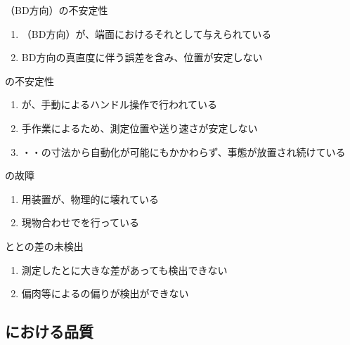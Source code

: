 \begin{Issues}{\KeywayCenterMeasurement（BD方向）の不安定性}
\begin{enumerate}[label=\sarrow]
\item[{\sarrow[red]}]\KeywayCenter（BD方向）が、端面におけるそれとして与えられている
\item[{\sarrow[red]}]BD方向の真直度に伴う誤差を含み、位置が安定しない
\end{enumerate}
\end{Issues}

\begin{Issues}{\CenterlineEndFaceDifMeasurement の不安定性}
\begin{enumerate}[label=\sarrow]
\item[{\sarrow[red]}]\CenterlineEndFaceDifMeasurement が、手動によるハンドル操作で行われている
\item[{\sarrow[red]}]手作業によるため、測定位置や送り速さが安定しない
\item[{\sarrow[red]}]\Outcut・\Keyway・\CenterCurvature の寸法から自動化が可能にもかかわらず、事態が放置され続けている
\end{enumerate}
\end{Issues}

\begin{Issues}{\TLMeasurement の故障}
\begin{enumerate}[label=\sarrow]
\item\TLMeasurement 用装置が、物理的に壊れている
\item 現物合わせで\TLMeasurement を行っている
\end{enumerate}
\end{Issues}

\begin{Issues}{\TopOutcutCenter と\BottomOutcutCenter との差の未検出}
\begin{enumerate}[label=\sarrow]
\item[{\sarrow[red]}]測定した\TopOutcutCenter と\BottomOutcutCenter に大きな差があっても検出できない
\item[{\sarrow[red]}]偏肉等による\OutcutCenter の偏りが検出ができない
\end{enumerate}
\end{Issues}


\subsection{\OutcutMilling における品質}

